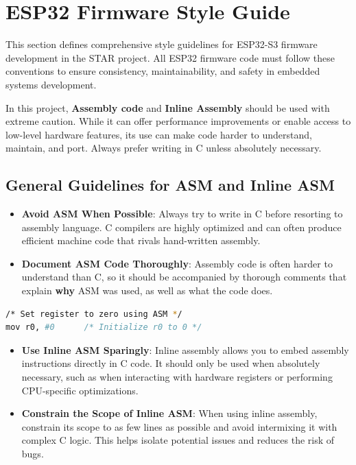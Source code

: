 
\newpage
\section{ESP32 Firmware Style Guide}
\label{sec:esp32-style}

This section defines comprehensive style guidelines for ESP32-S3 firmware development in the STAR project. All ESP32 firmware code must follow these conventions to ensure consistency, maintainability, and safety in embedded systems development.



In this project, \textbf{Assembly code} and \textbf{Inline Assembly} should be used with extreme caution. While it can offer performance improvements or enable access to low-level hardware features, its use can make code harder to understand, maintain, and port. Always prefer writing in C unless absolutely necessary.

\subsection{General Guidelines for ASM and Inline ASM}
\begin{itemize}
    \item \textbf{Avoid ASM When Possible}: Always try to write in C before resorting to assembly language. C compilers are highly optimized and can often produce efficient machine code that rivals hand-written assembly.
    \item \textbf{Document ASM Code Thoroughly}: Assembly code is often harder to understand than C, so it should be accompanied by thorough comments that explain \textbf{why} ASM was used, as well as what the code does.
\end{itemize}

\begin{lstlisting}[language=bash]
/* Set register to zero using ASM */
mov r0, #0      /* Initialize r0 to 0 */
\end{lstlisting}

\begin{itemize}
    \item \textbf{Use Inline ASM Sparingly}: Inline assembly allows you to embed assembly instructions directly in C code. It should only be used when absolutely necessary, such as when interacting with hardware registers or performing CPU-specific optimizations.
    \item \textbf{Constrain the Scope of Inline ASM}: When using inline assembly, constrain its scope to as few lines as possible and avoid intermixing it with complex C logic. This helps isolate potential issues and reduces the risk of bugs.
\end{itemize}

